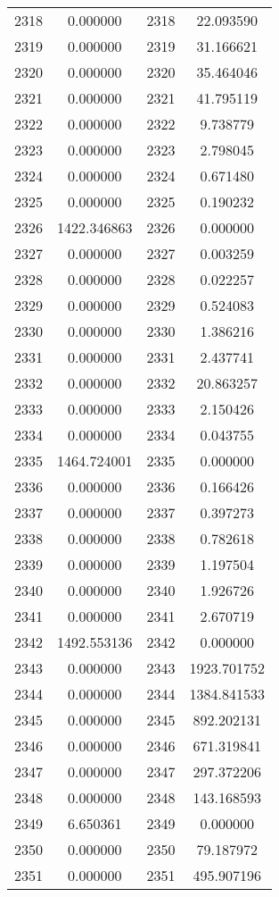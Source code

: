 \documentclass[12pt]{article}
\begin{document}
\begin{longtable}{@{}cccc@{}}
2318 & 0.000000 & 2318 & 22.093590 \\
2319 & 0.000000 & 2319 & 31.166621 \\
2320 & 0.000000 & 2320 & 35.464046 \\
2321 & 0.000000 & 2321 & 41.795119 \\
2322 & 0.000000 & 2322 & 9.738779 \\
2323 & 0.000000 & 2323 & 2.798045 \\
2324 & 0.000000 & 2324 & 0.671480 \\
2325 & 0.000000 & 2325 & 0.190232 \\
2326 & 1422.346863 & 2326 & 0.000000 \\
2327 & 0.000000 & 2327 & 0.003259 \\
2328 & 0.000000 & 2328 & 0.022257 \\
2329 & 0.000000 & 2329 & 0.524083 \\
2330 & 0.000000 & 2330 & 1.386216 \\
2331 & 0.000000 & 2331 & 2.437741 \\
2332 & 0.000000 & 2332 & 20.863257 \\
2333 & 0.000000 & 2333 & 2.150426 \\
2334 & 0.000000 & 2334 & 0.043755 \\
2335 & 1464.724001 & 2335 & 0.000000 \\
2336 & 0.000000 & 2336 & 0.166426 \\
2337 & 0.000000 & 2337 & 0.397273 \\
2338 & 0.000000 & 2338 & 0.782618 \\
2339 & 0.000000 & 2339 & 1.197504 \\
2340 & 0.000000 & 2340 & 1.926726 \\
2341 & 0.000000 & 2341 & 2.670719 \\
2342 & 1492.553136 & 2342 & 0.000000 \\
2343 & 0.000000 & 2343 & 1923.701752 \\
2344 & 0.000000 & 2344 & 1384.841533 \\
2345 & 0.000000 & 2345 & 892.202131 \\
2346 & 0.000000 & 2346 & 671.319841 \\
2347 & 0.000000 & 2347 & 297.372206 \\
2348 & 0.000000 & 2348 & 143.168593 \\
2349 & 6.650361 & 2349 & 0.000000 \\
2350 & 0.000000 & 2350 & 79.187972 \\
2351 & 0.000000 & 2351 & 495.907196 \\

\end{longtable}
\end{document}

